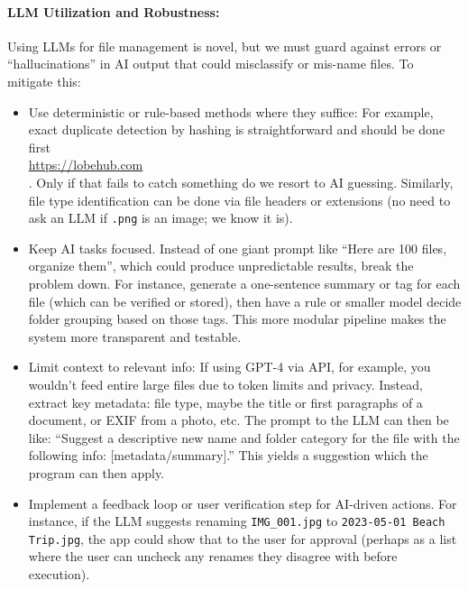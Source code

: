 \documentclass[11pt]{article}
\begin{document}
\paragraph{LLM Utilization and Robustness:} Using LLMs for file management is novel, but we must guard against errors or “hallucinations” in AI output that could misclassify or mis-name files. To mitigate this:
\begin{itemize}
  \item Use deterministic or rule-based methods where they suffice: For example, exact duplicate detection by hashing is straightforward and should be done first \\ \url{https://lobehub.com} \\ . Only if that fails to catch something do we resort to AI guessing. Similarly, file type identification can be done via file headers or extensions (no need to ask an LLM if \texttt{.png} is an image; we know it is).
  \item Keep AI tasks focused. Instead of one giant prompt like “Here are 100 files, organize them”, which could produce unpredictable results, break the problem down. For instance, generate a one-sentence summary or tag for each file (which can be verified or stored), then have a rule or smaller model decide folder grouping based on those tags. This more modular pipeline makes the system more transparent and testable.
  \item Limit context to relevant info: If using GPT-4 via API, for example, you wouldn’t feed entire large files due to token limits and privacy. Instead, extract key metadata: file type, maybe the title or first paragraphs of a document, or EXIF from a photo, etc. The prompt to the LLM can then be like: “Suggest a descriptive new name and folder category for the file with the following info: [metadata/summary].” This yields a suggestion which the program can then apply.
  \item Implement a feedback loop or user verification step for AI-driven actions. For instance, if the LLM suggests renaming \texttt{IMG\_001.jpg} to \texttt{2023-05-01 Beach Trip.jpg}, the app could show that to the user for approval (perhaps as a list where the user can uncheck any renames they disagree with before execution).
\end{itemize}
\end{document}
